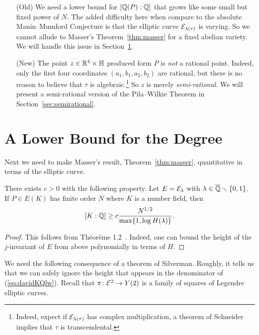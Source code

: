 \begin{enumerate}
\item [(Old)] We need a lower bound for $[{\mathbb{Q}}(P):{\mathbb{Q}}]$ that grows like
  some small but fixed power of $N$. The added difficulty here when
  compare to the absolute Manin--Mumford Conjecture is that the
  elliptic curve ${\mathcal E}_{\lambda(\tau)}$ is varying. So we cannot allude
  to Masser's Theorem~\ref{thm:masser} for a fixed abelian variety.
  We will handle this issue in
  Section~\ref{sec:lbdegrel}. 
  
\item[(New)] The point $z\in {\mathbb{R}}^4\times{\mathbb{H}}$ produced form $P$ is
  \emph{not} a rational point. Indeed, only the first four
  coordinates $(a_1,b_1,a_2,b_2)$ are rational, but there is no
  reason to believe that $\tau$ is algebraic.\footnote{Indeed,
    expect if ${\mathcal E}_{\lambda(\tau)}$ has complex multiplication, a
    theorem of Schneider implies that $\tau$ is transcendental.}
  So  $z$ is merely \textit{semi-rational}. We will present a
  semi-rational version of the Pila--Wilkie Theorem in
  Section~\ref{sec:semirational}. 
\end{enumerate}

\section{A Lower Bound for the Degree}
\label{sec:lbdegrel}

Next we need to make Masser's result, Theorem~\ref{thm:masser},
quantitative in terms of the elliptic curve.

\begin{theorem}[David]
  There exists $c>0$ with the following property. 
  Let $E={\mathcal E}_\lambda$ with $\lambda\in{\overline{\mathbb{Q}}}\smallsetminus\{0,1\}$. If $P\in
  E(K)$ has finite order $N$ where $K$ is a number field, then
  \begin{equation}
    \label{eq:davidKQlb}
    [K:{\mathbb{Q}}] \ge c \frac{N^{1/2}}{\max\{1,\log H(\lambda)\}}.
  \end{equation}    
\end{theorem}
\begin{proof}
  This follows from Th\'eor\`eme 1.2~\cite{DavidPetiteHauteur}.
  Indeed, one can bound
  the height of the $j$-invariant of $E$ from above polynomially in
  terms of $H$. 
\end{proof}

We need the following consequence of a theorem of Silverman. Roughly,
it tells us that we can safely ignore the height that appears in the
denominator of (\ref{eq:davidKQlw}). Recall that $\pi\colon
{\mathcal E}^2\rightarrow Y(2)$ is a family of squares of Legendre elliptic
curves.

